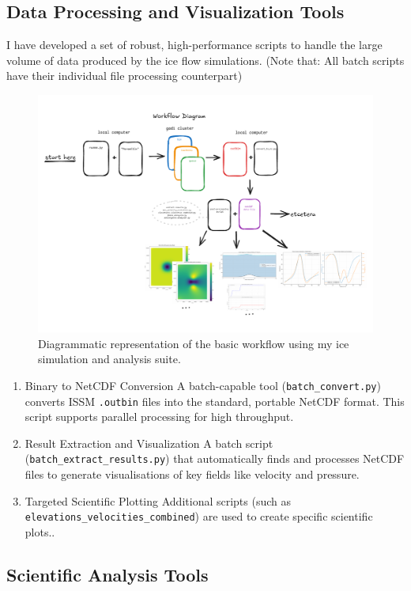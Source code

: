 \subsection{Data Processing and Visualization Tools}\label{dataviz}
I have developed a set of robust, high-performance scripts to handle the large volume of data produced by the ice flow simulations. (Note that: All batch scripts have their individual file processing counterpart)
\begin{figure}[H]
    \includegraphics[scale=0.58]{workflow_diagram.pdf}
    \caption{Diagrammatic representation of the basic workflow using my ice simulation and analysis suite. }
    \label{fig:workflow}
\end{figure}
\begin{enumerate}
\item{Binary to NetCDF Conversion} A batch-capable tool (\texttt{batch\_convert.py}) converts ISSM \texttt{.outbin} files into the standard, portable NetCDF format. This script supports parallel processing for high throughput.
\item{Result Extraction and Visualization} A batch script (\texttt{batch\_extract\_results.py}) that automatically finds and processes NetCDF files to generate visualisations of key fields like velocity and pressure. 
\item{Targeted Scientific Plotting} Additional scripts (such as \texttt{elevations\_velocities\_combined}) are used to create specific scientific plots..
\end{enumerate}

\subsection{Scientific Analysis Tools} 
